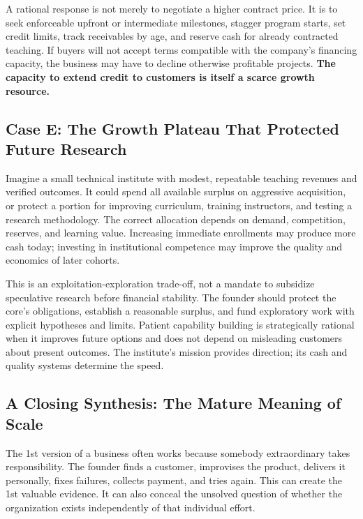 A rational response is not merely to negotiate a higher contract price. It is to seek enforceable upfront or intermediate milestones, stagger program starts, set credit limits, track receivables by age, and reserve cash for already contracted teaching. If buyers will not accept terms compatible with the company's financing capacity, the business may have to decline otherwise profitable projects. \textbf{The capacity to extend credit to customers is itself a scarce growth resource.}

\subsection*{Case E: The Growth Plateau That Protected Future Research}

Imagine a small technical institute with modest, repeatable teaching revenues and verified outcomes. It could spend all available surplus on aggressive acquisition, or protect a portion for improving curriculum, training instructors, and testing a research methodology. The correct allocation depends on demand, competition, reserves, and learning value. Increasing immediate enrollments may produce more cash today; investing in institutional competence may improve the quality and economics of later cohorts.

This is an exploitation-exploration trade-off, not a mandate to subsidize speculative research before financial stability. The founder should protect the core's obligations, establish a reasonable surplus, and fund exploratory work with explicit hypotheses and limits. Patient capability building is strategically rational when it improves future options and does not depend on misleading customers about present outcomes. The institute's mission provides direction; its cash and quality systems determine the speed.

\subsection*{A Closing Synthesis: The Mature Meaning of Scale}
\label{sec:closing_synthesis_mature_scale}

The 1st version of a business often works because somebody extraordinary takes responsibility. The founder finds a customer, improvises the product, delivers it personally, fixes failures, collects payment, and tries again. This can create the 1st valuable evidence. It can also conceal the unsolved question of whether the organization exists independently of that individual effort.


